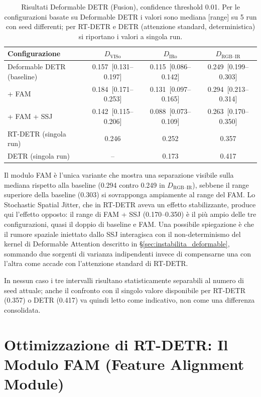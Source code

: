 \documentclass[a4paper,11pt]{article}
\begin{document}
\begin{table}[h]
\centering
\caption{Risultati Deformable DETR (Fusion), confidence threshold 0.01. Per le configurazioni basate su Deformable DETR i valori sono mediana [range] su 5 run con seed differenti; per RT-DETR e DETR (attenzione standard, deterministica) si riportano i valori a singola run.}
\label{tab:def_detr_results}
\begin{tabular}{lccc}
\toprule
Configurazione & $D_{\text{VISo}}$ & $D_{\text{IRo}}$ & $D_{\text{RGB--IR}}$ \\
\midrule
Deformable DETR (baseline) & 0.157~[0.131--0.197] & 0.115~[0.086--0.142] & 0.249~[0.199--0.303] \\
\quad + FAM & 0.184~[0.171--0.253] & 0.131~[0.097--0.165] & 0.294~[0.213--0.314] \\
\quad + FAM + SSJ & 0.142~[0.115--0.206] & 0.088~[0.073--0.109] & 0.263~[0.170--0.350] \\
\midrule
RT-DETR (singola run) & 0.246 & 0.252 & 0.357 \\
DETR (singola run) & -- & 0.173 & 0.417 \\
\bottomrule
\end{tabular}
\end{table}

Il modulo FAM è l'unica variante che mostra una separazione visibile sulla mediana rispetto alla baseline (0.294 contro 0.249 in $D_{\text{RGB--IR}}$), sebbene il range superiore della baseline (0.303) si sovrapponga ampiamente al range del FAM. Lo Stochastic Spatial Jitter, che in RT-DETR aveva un effetto stabilizzante, produce qui l'effetto opposto: il range di FAM + SSJ (0.170--0.350) è il più ampio delle tre configurazioni, quasi il doppio di baseline e FAM. Una possibile spiegazione è che il rumore spaziale iniettato dallo SSJ interagisca con il non-determinismo del kernel di Deformable Attention descritto in \S\ref{sec:instabilita_deformable}, sommando due sorgenti di varianza indipendenti invece di compensarne una con l'altra come accade con l'attenzione standard di RT-DETR.

In nessun caso i tre intervalli risultano statisticamente separabili al numero di seed attuale; anche il confronto con il singolo valore disponibile per RT-DETR (0.357) o DETR (0.417) va quindi letto come indicativo, non come una differenza consolidata.

\newpage

\section{Ottimizzazione di RT-DETR: Il Modulo FAM (Feature Alignment Module)}
\end{document}
